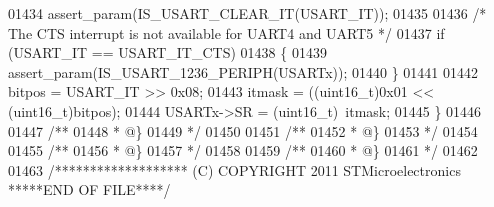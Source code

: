 \begin{DoxyCode}
01434   assert_param(IS\_USART\_CLEAR\_IT(USART\_IT));
01435 
01436   \textcolor{comment}{/* The CTS interrupt is not available for UART4 and UART5 */}
01437   \textcolor{keywordflow}{if} (USART\_IT == USART_IT_CTS)
01438   \{
01439     assert_param(IS\_USART\_1236\_PERIPH(USARTx));
01440   \}
01441 
01442   bitpos = USART\_IT >> 0x08;
01443   itmask = ((uint16\_t)0x01 << (uint16\_t)bitpos);
01444   USARTx->SR = (uint16\_t)~itmask;
01445 \}
01446 
01447 \textcolor{comment}{/**}
01448 \textcolor{comment}{  * @\}}
01449 \textcolor{comment}{  */}
01450 
01451 \textcolor{comment}{/**}
01452 \textcolor{comment}{  * @\}}
01453 \textcolor{comment}{  */}
01454 
01455 \textcolor{comment}{/**}
01456 \textcolor{comment}{  * @\}}
01457 \textcolor{comment}{  */}
01458 
01459 \textcolor{comment}{/**}
01460 \textcolor{comment}{  * @\}}
01461 \textcolor{comment}{  */}
01462 
01463 \textcolor{comment}{/******************* (C) COPYRIGHT 2011 STMicroelectronics *****END OF FILE****/}
\end{DoxyCode}
